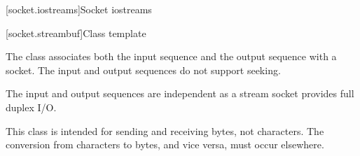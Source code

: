
[socket.iostreams]{Socket iostreams}


[socket.streambuf]{Class template }

\pnum
The class  associates both the input sequence and the output sequence with a socket. The input and output sequences do not support seeking. \begin{note} The input and output sequences are independent as a stream socket provides full duplex I/O. \end{note}

\pnum
 \begin{note} This class is intended for sending and receiving bytes, not characters. The conversion from characters to bytes, and vice versa, must occur elsewhere. \end{note}

